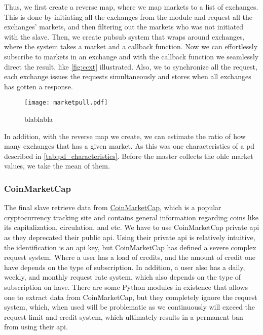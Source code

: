 Thus, we first create a reverse map, where we map markets to a list of exchanges. This is done by initiating all the exchanges from the module and request all the exchanges' markets, and then filtering out the markets who was not initiated with the slave. Then, we create pubsub system that wraps around exchanges, where the system takes a market and a callback function. Now we can effortlessly subscribe to markets in an exchange and with the callback function we seamlessly direct the result, like \autoref{fig:ccxt} illustrated. Also, we to synchronize all the request, each exchange issues the requests simultaneously and stores when all exchanges has gotten a response. 

\begin{figure}
    \centering
    \texttt{[image: marketpull.pdf]}
    \caption{blablabla}
    \label{fig:ccxt}
\end{figure}

In addition, with the reverse map we create, we can estimate the ratio of how many exchanges that has a given market. As this was one characteristics of a \ac{pd} described in \autoref{tab:pd_characteristics}. Before the master collects the \ac{ohlc} market values, we take the mean of them.

\subsubsection{CoinMarketCap}
The final slave retrieve data from \href{https://coinmarketcap.com/}{CoinMarketCap}, which is a popular cryptocurrency tracking site and contains general information regarding coins like its capitalization, circulation, and etc. We have to use CoinMarketCap private \ac{api} as they deprecated their public \ac{api}. Using their private \ac{api} is relatively intuitive, the identification is an \ac{api} key, but CoinMarketCap has defined a severe complex request system. Where a user has a load of credits, and the amount of credit one have depends on the type of subscription. In addition, a user also has a daily, weekly, and monthly request rate system, which also depends on the type of subscription on have. There are some Python modules in existence that allows one to extract data from CoinMarketCap, but they completely ignore the request system, which, when used will be problematic as we continuously will exceed the request limit and credit system, which ultimately results in a permanent ban from using their \ac{api}.

